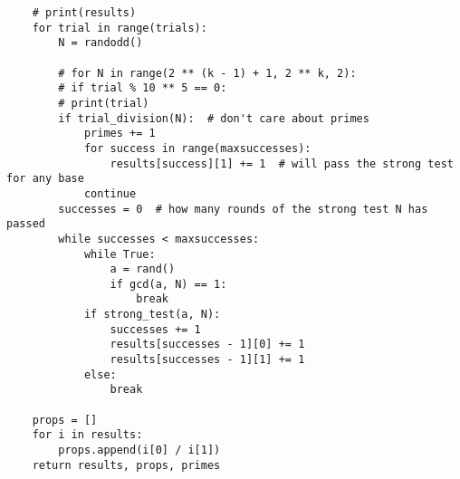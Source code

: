 \documentclass[10pt,a4paper]{report}
\begin{document}
\begin{verbatim}
    # print(results)
    for trial in range(trials):
        N = randodd()

        # for N in range(2 ** (k - 1) + 1, 2 ** k, 2):
        # if trial % 10 ** 5 == 0:
        # print(trial)
        if trial_division(N):  # don't care about primes
            primes += 1
            for success in range(maxsuccesses):
                results[success][1] += 1  # will pass the strong test for any base
            continue
        successes = 0  # how many rounds of the strong test N has passed
        while successes < maxsuccesses:
            while True:
                a = rand()
                if gcd(a, N) == 1:
                    break
            if strong_test(a, N):
                successes += 1
                results[successes - 1][0] += 1
                results[successes - 1][1] += 1
            else:
                break

    props = []
    for i in results:
        props.append(i[0] / i[1])
    return results, props, primes

\end{verbatim}
\end{document}
